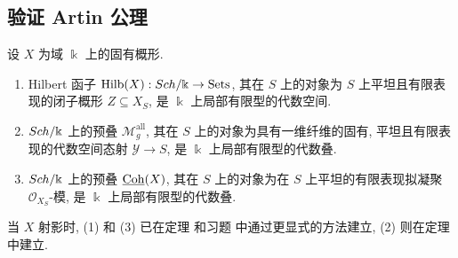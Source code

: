 \subsection{验证 Artin 公理}\label{src:C.7.2-subsection}
\begin{theorem}\label{src:C.7.7}
设 $X$ 为域 $\Bbbk$ 上的固有概形.
\begin{enumerate}[(1)]
\item Hilbert 函子 $\operatorname{Hilb}(X):Sch/\Bbbk\to\mathrm{Sets}$, 其在 $S$ 上的对象为 $S$ 上平坦且有限表现的闭子概形 $Z\subseteq X_S$, 是 $\Bbbk$ 上局部有限型的代数空间.
\item $Sch/\Bbbk$ 上的预叠 $\mathcal M_g^{\mathrm{all}}$, 其在 $S$ 上的对象为具有一维纤维的固有, 平坦且有限表现的代数空间态射 $\mathcal Y\to S$, 是 $\Bbbk$ 上局部有限型的代数叠.
\item $Sch/\Bbbk$ 上的预叠 $\underline{\mathrm{Coh}}(X)$, 其在 $S$ 上的对象为在 $S$ 上平坦的有限表现拟凝聚 $\mathcal O_{X_S}$-模, 是 $\Bbbk$ 上局部有限型的代数叠.
\end{enumerate}
\end{theorem}
当 $X$ 射影时, (1) 和 (3) 已在定理  和习题  中通过更显式的方法建立, (2) 则在定理  中建立.
